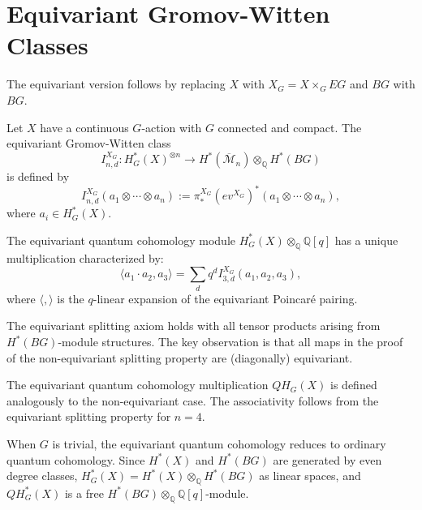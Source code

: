 \section{Equivariant Gromov-Witten Classes}

The equivariant version follows by replacing $X$ with $X_G = X \times_G EG$ and $BG$ with $BG$.

\begin{Definition}
\label{def:EquivariantGromovWittenClass}
Let $X$ have a continuous $G$-action with $G$ connected and compact. The equivariant Gromov-Witten class
\[
I_{n,d}^{X_G}: H_G^*(X)^{\otimes n} \to H^*(\overline{\mathcal{M}}_n) \otimes_{\mathbb{Q}} H^*(BG)
\]
is defined by
\begin{equation}
I_{n,d}^{X_G}(a_1 \otimes \cdots \otimes a_n) := \pi_*^{X_G} (ev^{X_G})^*(a_1 \otimes \cdots \otimes a_n),
\label{eq:equivariant-gromov-witten}
\end{equation}
where $a_i \in H_G^*(X)$.
\end{Definition}

The equivariant quantum cohomology module $H_G^*(X) \otimes_{\mathbb{Q}} \mathbb{Q}[q]$ has a unique multiplication characterized by:
\begin{equation}
\langle a_1 \cdot a_2, a_3 \rangle = \sum_d q^d I_{3,d}^{X_G}(a_1, a_2, a_3),
\label{eq:equivariant-quantum-mult}
\end{equation}
where $\langle, \rangle$ is the $q$-linear expansion of the equivariant Poincar\'e pairing.

The equivariant splitting axiom holds with all tensor products arising from $H^*(BG)$-module structures. The key observation is that all maps in the proof of the non-equivariant splitting property are (diagonally) equivariant.

\begin{Theorem}
\label{th:EquivariantQuantumCohomologyModule}
The equivariant quantum cohomology multiplication $QH_G(X)$ is defined analogously to the non-equivariant case. The associativity follows from the equivariant splitting property for $n=4$.
\end{Theorem}

When $G$ is trivial, the equivariant quantum cohomology reduces to ordinary quantum cohomology. Since $H^*(X)$ and $H^*(BG)$ are generated by even degree classes, $H_G^*(X) = H^*(X) \otimes_{\mathbb{Q}} H^*(BG)$ as linear spaces, and $QH_G^*(X)$ is a free $H^*(BG) \otimes_{\mathbb{Q}} \mathbb{Q}[q]$-module.

